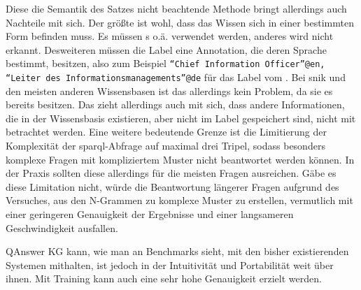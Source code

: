 Diese die Semantik des Satzes nicht beachtende Methode bringt allerdings auch Nachteile mit sich.
Der größte ist wohl, dass das Wissen sich in einer bestimmten Form befinden muss.
Es müssen s o.ä. verwendet werden, anderes wird nicht erkannt.
Desweiteren müssen die Label eine Annotation, die deren Sprache bestimmt, besitzen, also zum Beispiel \texttt{\enquote{Chief Information Officer}@en, \enquote{Leiter des Informationsmanagements}@de}
für das Label vom .
Bei \ac{snik} und den meisten anderen Wissensbasen ist das allerdings kein Problem, da sie es bereits besitzen.
Das zieht allerdings auch mit sich, dass andere Informationen, die in der Wissensbasis existieren, aber nicht im Label gespeichert sind, nicht mit betrachtet werden.
Eine weitere bedeutende Grenze ist die Limitierung der Komplexität der \ac{sparql}-Abfrage auf maximal drei Tripel, sodass besonders komplexe Fragen mit kompliziertem Muster nicht beantwortet werden können.
In der Praxis sollten diese allerdings für die meisten Fragen ausreichen.
Gäbe es diese Limitation nicht, würde die Beantwortung längerer Fragen aufgrund des Versuches, aus den N-Grammen zu komplexe Muster zu erstellen,
vermutlich mit einer geringeren Genauigkeit der Ergebnisse und einer langsameren Geschwindigkeit ausfallen.

QAnswer KG kann, wie man an Benchmarks sieht, mit den bisher existierenden Systemen mithalten, ist jedoch in der Intuitivität und Portabilität weit über ihnen.
Mit Training kann auch eine sehr hohe Genauigkeit erzielt werden.
